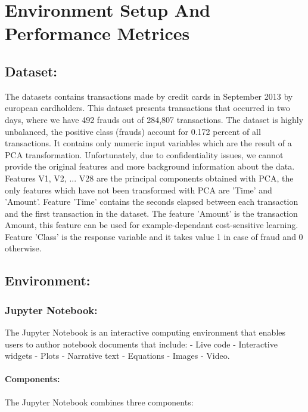 \documentclass{report}
\begin{document}
\chapter{Environment Setup And Performance Metrices}

\section{Dataset: }
The datasets contains transactions made by credit cards in September 2013 by european cardholders. This dataset presents transactions that occurred in two days, where we have 492 frauds out of 284,807 transactions. The dataset is highly unbalanced, the positive class (frauds) account for 0.172 percent of all transactions.
It contains only numeric input variables which are the result of a PCA transformation. Unfortunately, due to confidentiality issues, we cannot provide the original features and more background information about the data. Features V1, V2, ... V28 are the principal components obtained with PCA, the only features which have not been transformed with PCA are 'Time' and 'Amount'. Feature 'Time' contains the seconds elapsed between each transaction and the first transaction in the dataset. The feature 'Amount' is the transaction Amount, this feature can be used for example-dependant cost-sensitive learning. Feature 'Class' is the response variable and it takes value 1 in case of fraud and 0 otherwise.

\section{Environment: }
\subsection{Jupyter Notebook: }
The Jupyter Notebook is an interactive computing environment that enables users to author notebook documents that include: - Live code - Interactive widgets - Plots - Narrative text - Equations - Images - Video.

\subsubsection{Components: } The Jupyter Notebook combines three components:
\end{document}
